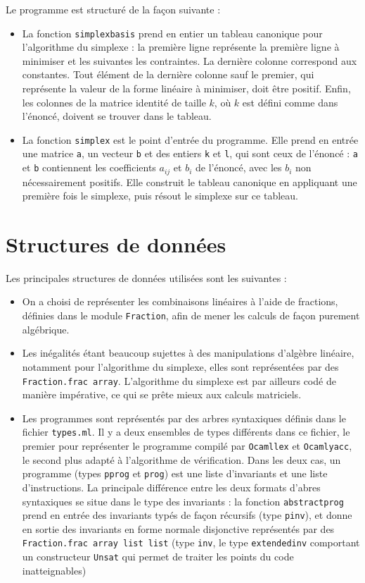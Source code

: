 \documentclass[a4paper]{article}
\begin{document}
Le programme est structuré de la façon suivante :

\begin{itemize}
  \item La fonction \texttt{simplex\textunderscore basis} prend en entier un tableau canonique pour l'algorithme du simplexe : la première ligne représente la première ligne à minimiser et les suivantes les contraintes. La dernière colonne correspond aux constantes. Tout élément de la dernière colonne sauf le premier, qui représente la valeur de la forme linéaire à minimiser, doit être positif. Enfin, les colonnes de la matrice identité de taille $k$, où $k$ est défini comme dans l'énoncé, doivent se trouver dans le tableau.
  \item La fonction \texttt{simplex} est le point d'entrée du programme. Elle prend en entrée une matrice \texttt{a}, un vecteur \texttt{b} et des entiers \texttt{k} et \texttt{l}, qui sont ceux de l'énoncé : \texttt{a} et \texttt{b} contiennent les coefficients $a_{ij}$ et $b_i$ de l'énoncé, avec les $b_i$ non nécessairement positifs. Elle construit le tableau canonique en appliquant une première fois le simplexe, puis résout le simplexe sur ce tableau.
\end{itemize}

\section{Structures de données}

Les principales structures de données utilisées sont les suivantes :

\begin{itemize}
  \item On a choisi de représenter les combinaisons linéaires à l'aide de fractions, définies dans le module \texttt{Fraction}, afin de mener les calculs de façon purement algébrique.
  \item Les inégalités étant beaucoup sujettes à des manipulations d'algèbre linéaire, notamment pour l'algorithme du simplexe, elles sont représentées par des \texttt{Fraction.frac array}. L'algorithme du simplexe est par ailleurs codé de manière impérative, ce qui se prête mieux aux calculs matriciels.
  \item Les programmes sont représentés par des arbres syntaxiques définis dans le fichier \texttt{types.ml}. Il y a deux ensembles de types différents dans ce fichier, le premier pour représenter le programme compilé par \texttt{Ocamllex} et \texttt{Ocamlyacc}, le second plus adapté à l'algorithme de vérification. Dans les deux cas, un programme (types \texttt{pprog} et \texttt{prog}) est une liste d'invariants et une liste d'instructions. La principale différence entre les deux formats d'abres syntaxiques se situe dans le type des invariants : la fonction \texttt{abstract\textunderscore prog} prend en entrée des invariants typés de façon récursifs (type \texttt{pinv}), et donne en sortie des invariants en forme normale disjonctive représentés par des \texttt{Fraction.frac array list list} (type \texttt{inv}, le type \texttt{extended\textunderscore inv} comportant un constructeur \texttt{Unsat} qui permet de traiter les points du code inatteignables)
\end{itemize}
\end{document}
